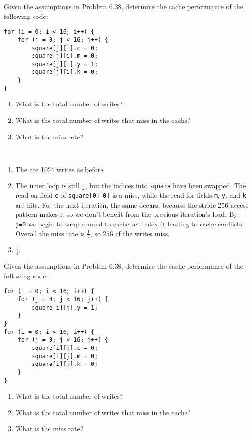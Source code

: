 \documentclass[12pt]{article}
\newenvironment{ex}[2][Exercise]{\begin{trivlist}
		\item[\hskip \labelsep {\bfseries #1}\hskip \labelsep {\bfseries #2.}]}{\end{trivlist}}
\newenvironment{sol}[1][Solution]{\begin{trivlist}
		\item[\hskip \labelsep {\bfseries #1:}]}{\end{trivlist}}
\begin{document}
\begin{ex}{6.39}
	Given the assumptions in Problem 6.38, determine the cache performance of the following code:
	\begin{lstlisting}
for (i = 0; i < 16; i++) {
	for (j = 0; j < 16; j++) {
		square[j][i].c = 0;
		square[j][i].m = 0;
		square[j][i].y = 1;
		square[j][i].k = 0;
	}
}
	\end{lstlisting}
	\begin{enumerate}[label=(\alph*)]
		\item What is the total number of writes?
		\item What is the total number of writes that miss in the cache?
		\item What is the miss rate?
	\end{enumerate}
\end{ex}

\begin{sol}
	\
	\begin{enumerate}[label=(\alph*)]
		\item The are 1024 writes as before.
		\item The inner loop is still \texttt{j}, but the indices into \texttt{square} have been
		swapped. The read on field \texttt{c} of \texttt{square[0][0]} is a miss, while the read for
		fields \texttt{m}, \texttt{y}, and \texttt{k} are hits. For the next iteration, the same occurs,
		because the stride-256 access pattern makes it so we don't benefit from the previous iteration's load.
		By \texttt{j=0} we begin to wrap around to cache set index 0, leading to cache conflicts.
		Overall the miss rate is $\frac{1}{4}$, so $256$ of the writes miss.
		\item $\frac{1}{4}$.	
	\end{enumerate}
\end{sol}

\begin{ex}{6.40}
	Given the assumptions in Problem 6.38, determine the cache performance of the following code:
	\begin{lstlisting}
for (i = 0; i < 16; i++) {
	for (j = 0; j < 16; j++) {
		square[i][j].y = 1;
	}
}
for (i = 0; i < 16; i++) {
	for (j = 0; j < 16; j++) {
		square[i][j].c = 0;
		square[i][j].m = 0;
		square[i][j].k = 0;
	}
}
	\end{lstlisting}
	\begin{enumerate}[label=(\alph*)]
		\item What is the total number of writes?
		\item What is the total number of writes that miss in the cache?
		\item What is the miss rate?
	\end{enumerate}
\end{ex}
\end{document}
